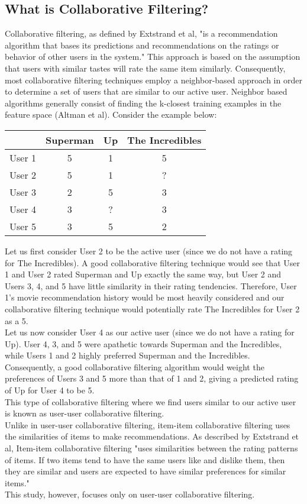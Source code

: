\documentclass[11pt,letterpaper]{article}
\begin{document}
\subsection{What is Collaborative Filtering?}
Collaborative filtering, as defined by Extstrand et al, "is a recommendation algorithm that bases its predictions and recommendations on the ratings or behavior of other users in the system." This approach is based on the assumption that users with similar tastes will rate the same item similarly. Consequently, most collaborative filtering techniques employ a neighbor-based approach in order to determine a set of users that are similar to our active user. Neighbor based algorithms generally consist of finding the k-closest training examples in the feature space (Altman et al).
Consider the example below:
\begin{center}
 \begin{tabular}{||c c c c||}
 \hline
  & Superman & Up & The Incredibles \\ [0.5ex]
 \hline\hline
 User 1 & 5 & 1 & 5 \\
 \hline
 User 2 & 5 & 1 & ? \\
 \hline
 User 3 & 2 & 5 & 3 \\
 \hline
 User 4 & 3 & ? & 3 \\
 \hline
 User 5 & 3 & 5 & 2 \\
 \hline
\end{tabular}
\end{center}
Let us first consider User 2 to be the active user (since we do not have a rating for The Incredibles). A good collaborative filtering technique would see that User 1 and User 2 rated Superman and Up exactly the same way, but User 2 and Users 3, 4, and 5 have little similarity in their rating tendencies. Therefore, User 1's movie recommendation history would be most heavily considered and our collaborative filtering technique would potentially rate The Incredibles for User 2 as a 5.\\
Let us now consider User 4 as our active user (since we do not have a rating for Up). User 4, 3, and 5 were apathetic towards Superman and the Incredibles, while Users 1 and 2 highly preferred Superman and the Incredibles. Consequently, a good collaborative filtering algorithm would weight the preferences of Users 3 and 5 more than that of 1 and 2, giving a predicted rating of Up for User 4 to be 5.\\
This type of collaborative filtering where we find users similar to our active user is known as user-user collaborative filtering.\\
Unlike in user-user collaborative filtering, item-item collaborative filtering uses the similarities of items to make recommendations. As described by Extstrand et al, Item-item collaborative filtering "uses similarities between the rating patterns of items. If two items tend to have the same users like and dislike them, then they are similar and users are expected to have similar preferences for similar items."\\
This study, however, focuses only on user-user collaborative filtering.
\end{document}
